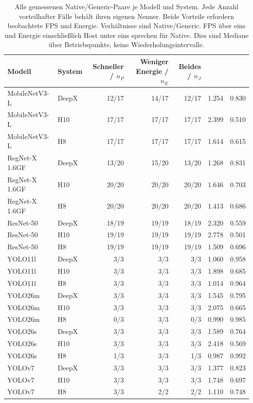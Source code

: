 \begingroup\small
\begin{longtable}{l l r r r S[table-format=1.3] S[table-format=1.3]}
\caption{Alle gemessenen Native/Generic-Paare je Modell und System. Jede Anzahl vorteilhafter Fälle behält ihren eigenen Nenner. Beide Vorteile erfordern beobachtete FPS und Energie. Verhältnisse sind Native/Generic. FPS über eins und Energie einschließlich Host unter eins sprechen für Native. Dies sind Mediane über Betriebspunkte, keine Wiederholungsintervalle.}\\
\toprule
Modell & System & Schneller / $n_P$ & Weniger Energie / $n_E$ & Beides / $n_J$ & {} & {} \\
\midrule\endhead
MobileNetV3-L & DeepX & 12/17 & 14/17 & 12/17 & 1.254 & 0.830 \\
MobileNetV3-L & H10 & 17/17 & 17/17 & 17/17 & 2.399 & 0.510 \\
MobileNetV3-L & H8 & 17/17 & 17/17 & 17/17 & 1.614 & 0.615 \\
RegNet-X 1.6GF & DeepX & 13/20 & 15/20 & 13/20 & 1.268 & 0.831 \\
RegNet-X 1.6GF & H10 & 20/20 & 20/20 & 20/20 & 1.646 & 0.703 \\
RegNet-X 1.6GF & H8 & 20/20 & 20/20 & 20/20 & 1.413 & 0.686 \\
ResNet-50 & DeepX & 18/19 & 19/19 & 18/19 & 2.320 & 0.559 \\
ResNet-50 & H10 & 19/19 & 19/19 & 19/19 & 2.778 & 0.501 \\
ResNet-50 & H8 & 19/19 & 19/19 & 19/19 & 1.509 & 0.696 \\
YOLO11l & DeepX & 3/3 & 3/3 & 3/3 & 1.060 & 0.958 \\
YOLO11l & H10 & 3/3 & 3/3 & 3/3 & 1.898 & 0.685 \\
YOLO11l & H8 & 3/3 & 3/3 & 3/3 & 1.014 & 0.964 \\
YOLO26m & DeepX & 3/3 & 3/3 & 3/3 & 1.545 & 0.795 \\
YOLO26m & H10 & 3/3 & 3/3 & 3/3 & 2.075 & 0.665 \\
YOLO26m & H8 & 0/3 & 3/3 & 0/3 & 0.990 & 0.985 \\
YOLO26s & DeepX & 3/3 & 3/3 & 3/3 & 1.589 & 0.764 \\
YOLO26s & H10 & 3/3 & 3/3 & 3/3 & 2.418 & 0.569 \\
YOLO26s & H8 & 1/3 & 3/3 & 1/3 & 0.987 & 0.992 \\
YOLOv7 & DeepX & 3/3 & 3/3 & 3/3 & 1.377 & 0.823 \\
YOLOv7 & H10 & 3/3 & 3/3 & 3/3 & 1.748 & 0.697 \\
YOLOv7 & H8 & 3/3 & 2/2 & 2/2 & 1.110 & 0.748 \\
\bottomrule
\end{longtable}
\endgroup
